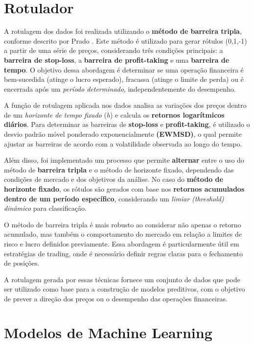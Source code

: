 \documentclass{article}
\begin{document}
\newpage

\section{Rotulador}

A rotulagem dos dados foi realizada utilizando o \textbf{método de barreira tripla}, conforme descrito por Prado \cite{Prado}. Este método é utilizado para gerar rótulos (0,1,-1) a partir de uma série de preços, considerando três condições principais: a \textbf{barreira de stop-loss}, a \textbf{barreira de profit-taking} e uma \textbf{barreira de tempo}. O objetivo dessa abordagem é determinar se uma operação financeira é bem-sucedida (atinge o lucro esperado), fracassa (atinge o limite de perda) ou é encerrada após um \textit{período determinado}, independentemente do desempenho.

A função de rotulagem aplicada nos dados analisa as variações dos preços dentro de um \textit{horizonte de tempo fixado} (\emph{h}) e calcula os \textbf{retornos logarítmicos diários}. Para determinar as barreiras de \textbf{stop-loss} e \textbf{profit-taking}, é utilizado o desvio padrão móvel ponderado exponencialmente \textbf{(EWMSD)}, o qual permite ajustar as barreiras de acordo com a volatilidade observada ao longo do tempo.

Além disso, foi implementado um processo que permite \textbf{alternar} entre o uso do método de \textbf{barreira tripla} e o método de horizonte fixado, dependendo das condições de mercado e dos objetivos da análise. No caso do \textbf{método de horizonte fixado}, os rótulos são gerados com base nos \textbf{retornos acumulados dentro de um período específico}, considerando um \textit{limiar (threshold) dinâmico} para classificação.

O método de barreira tripla é mais robusto ao considerar não apenas o retorno acumulado, mas também o comportamento do mercado em relação a limites de risco e lucro definidos previamente. Essa abordagem é particularmente útil em estratégias de trading, onde é necessário definir regras claras para o fechamento de posições.

A rotulagem gerada por essas técnicas fornece um conjunto de dados que pode ser utilizado como base para a construção de modelos preditivos, com o objetivo de prever a direção dos preços ou o desempenho das operações financeiras.

\newpage

\section{Modelos de Machine Learning}
\end{document}
